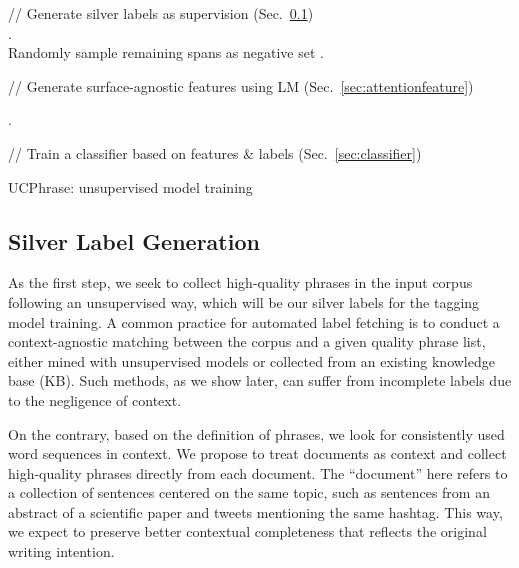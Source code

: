 \documentclass[sigconf]{acmart}
\newcommand{\our}{\mbox{UCPhrase}\xspace}
\newcommand{\algcomment}[1]{\textcolor{gblue}{{#1}}} \newcommand{\hlpgen}[2]{\fboxsep1pt \colorbox{ggreen!#2}{\strut #1}} \newcommand{\hlcov}[2]{\fboxsep1pt \colorbox{gyellow!#2}{\strut #1}} \newcommand{\error}[1]{\textcolor{gred}{\textbf{#1}}} \newcommand{\fph}[1]{\textcolor{ggreen}{\textbf{#1}}} \newcommand{\reph}[1]{\textcolor{ggreen}{\textbf{#1}}} \newcommand{\novelh}[1]{\textcolor{gblue}{\textbf{#1}}}
\begin{document}
\begin{algorithm}[t]
\small
{}
	
\algcomment{// Generate silver labels as supervision (Sec.~\ref{sec:labelgeneration})} \\ 
	 {
. \\
Randomly sample remaining spans as negative set .
	}
	
\algcomment{// Generate surface-agnostic features using LM (Sec.~\ref{sec:attentionfeature})} \\ 
	\vspace{-.2em}
	 {

	}
	.
	
\algcomment{// Train a classifier based on features \& labels (Sec.~\ref{sec:classifier})} \\
	\caption{\our: unsupervised model training}
	\label{alg:main}
\end{algorithm} 


\subsection{Silver Label Generation}
\label{sec:labelgeneration}

As the first step, we seek to collect high-quality phrases in the input corpus following an unsupervised way, which will be our silver labels for the tagging model training.
A common practice for automated label fetching is to conduct a context-agnostic matching between the corpus and a given quality phrase list, either mined with unsupervised models or collected from an existing knowledge base (KB).
Such methods, as we show later, can suffer from incomplete labels due to the negligence of context.

On the contrary, based on the definition of phrases, we look for consistently used word sequences in context.
We propose to treat documents as context and collect high-quality phrases directly from each document.
The ``document'' here refers to a collection of sentences centered on the same topic, such as sentences from an abstract of a scientific paper and tweets mentioning the same hashtag. 
This way, we expect to preserve better contextual completeness that reflects the original writing intention.
\end{document}
